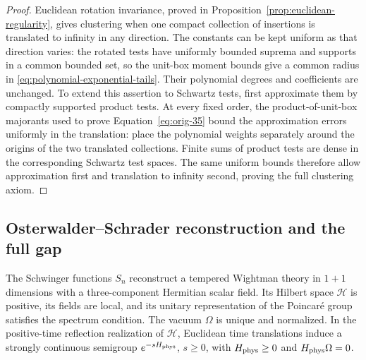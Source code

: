 \begin{proof}
Euclidean rotation invariance, proved in
Proposition~\ref{prop:euclidean-regularity}, gives clustering when one
compact collection of insertions is translated to infinity in any
direction.  The constants can be kept uniform as that direction varies:
the rotated tests have uniformly bounded suprema and supports in a
common bounded set, so the unit-box moment bounds give a common radius
in \eqref{eq:polynomial-exponential-tails}.  Their polynomial degrees
and coefficients are unchanged.  To extend this assertion to Schwartz tests, first approximate
them by compactly supported product tests.  At every fixed order, the
product-of-unit-box majorants used to prove
Equation~\eqref{eq:orig-35} bound the approximation errors uniformly in
the translation: place the polynomial weights separately around the
origins of the two translated collections.  Finite sums of product
tests are dense in the corresponding Schwartz test spaces.  The same
uniform bounds therefore allow approximation first and translation to
infinity second, proving the full clustering axiom.
\end{proof}

\subsection{Osterwalder--Schrader reconstruction and the full gap}

\begin{proposition}
\label{prop:os-reconstruction}
The Schwinger functions $S_n$ reconstruct a tempered Wightman theory in
$1+1$ dimensions with a three-component Hermitian scalar field.  Its
Hilbert space $\mathcal H$ is positive, its fields are local, and its
unitary representation of the Poincar\'e group satisfies the spectrum
condition.  The vacuum $\Omega$ is unique and normalized.  In the
positive-time reflection realization of $\mathcal H$, Euclidean time
translations induce a strongly continuous semigroup
$e^{-sH_{\rm phys}}$, $s\ge0$, with $H_{\rm phys}\ge0$ and
$H_{\rm phys}\Omega=0$.
\end{proposition}

